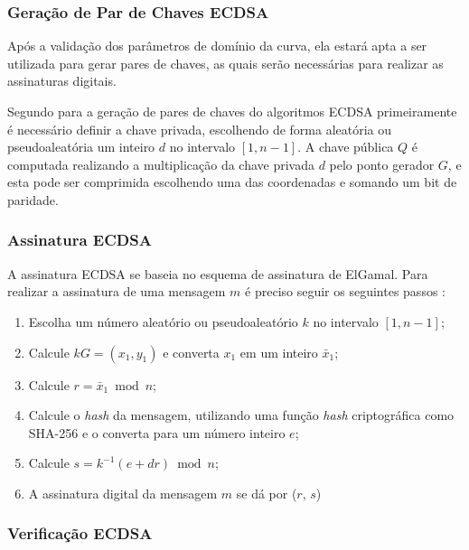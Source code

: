 \subsubsection{Geração de Par de Chaves ECDSA}

Após a validação dos parâmetros de domínio da curva, ela estará apta a ser utilizada para gerar pares de chaves, as quais serão necessárias para realizar as assinaturas digitais.

Segundo  para a geração de pares de chaves do algoritmos ECDSA primeiramente é necessário definir a chave privada, escolhendo de forma aleatória ou pseudoaleatória um inteiro $d$ no intervalo $[1, n - 1]$. A chave pública $Q$ é computada realizando a multiplicação da chave privada $d$ pelo ponto gerador $G$, e esta pode ser comprimida escolhendo uma das coordenadas e somando um bit de paridade.

\subsubsection{Assinatura ECDSA}
 
A assinatura ECDSA se baseia no esquema de assinatura de ElGamal. Para realizar a assinatura de uma mensagem $m$ é preciso seguir os seguintes passos \cite{johnson2001elliptic}:
\begin{enumerate}
    \item Escolha um número aleatório ou pseudoaleatório $k$ no intervalo $[1, n - 1]$;
    \item Calcule $kG = (x_1,y_1)$ e converta $x_1$ em um inteiro $\bar x_1$;
    \item Calcule $r = \bar x_1 \bmod{n}$;
    \item Calcule o \textit{hash} da mensagem, utilizando uma função \textit{hash} criptográfica como SHA-256 e o converta para um número inteiro $e$;
    \item Calcule $s = k^{-1} (e + dr) \bmod{n}$;
    \item A assinatura digital da mensagem $m$ se dá por ($r$, $s$)
\end{enumerate}

\subsubsection{Verificação ECDSA}


